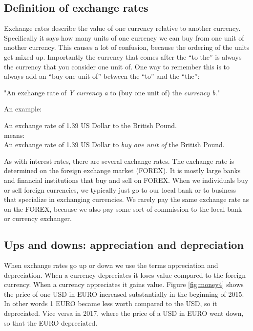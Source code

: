 \documentclass[]{book}
\begin{document}
\hypertarget{definition-of-exchange-rates}{%
\subsection{Definition of exchange rates}\label{definition-of-exchange-rates}}

Exchange rates describe the value of one currency relative to another currency. Specifically it says how many units of one currency we can buy from one unit of another currency. This causes a lot of confusion, because the ordering of the units get mixed up. Importantly the currency that comes after the ``to the'' is always the currency that you consider one unit of. One way to remember this is to always add an ``buy one unit of'' between the ``to'' and the ``the'':

\begin{center}
    "An exchange rate of \emph{Y} \emph{currency a} to (buy one unit of) the \emph{currency b}."
\end{center}

An example:

\begin{center}
    An exchange rate of 1.39 US Dollar to  the British Pound.\vspace{12pt}\\
    means:\vspace{12pt}\\
    An exchange rate of 1.39 US Dollar to \emph{buy one unit of} the British Pound.\\
\end{center}

As with interest rates, there are several exchange rates. The exchange rate is determined on the foreign exchange market (FOREX). It is mostly large banks and financial institutions that buy and sell on FOREX. When we individuals buy or sell foreign currencies, we typically just go to our local bank or to business that specialize in exchanging currencies. We rarely pay the same exchange rate as on the FOREX, because we also pay some sort of commission to the local bank or currency exchanger.

\hypertarget{ups-and-downs-appreciation-and-depreciation}{%
\subsection{Ups and downs: appreciation and depreciation}\label{ups-and-downs-appreciation-and-depreciation}}

When exchange rates go up or down we use the terms appreciation and depreciation. When a currency depreciates it loses value compared to the foreign currency. When a currency appreciates it gains value. Figure \ref{fig:money4} shows the price of one USD in EURO increased substantially in the beginning of 2015. In other words 1 EURO became less worth compared to the USD, so it depreciated. Vice versa in 2017, where the price of a USD in EURO went down, so that the EURO depreciated.
\end{document}
